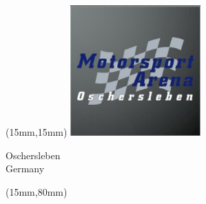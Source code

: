 \begin{textblock*}{50mm}(15mm,15mm)%
\includegraphics[width=50mm]{LG/2015-05-20_00090.png}
\par Oschersleben\\ Germany
\end{textblock*}
\begin{textblock*}{185mm}(15mm,80mm)%
\end{textblock*}
